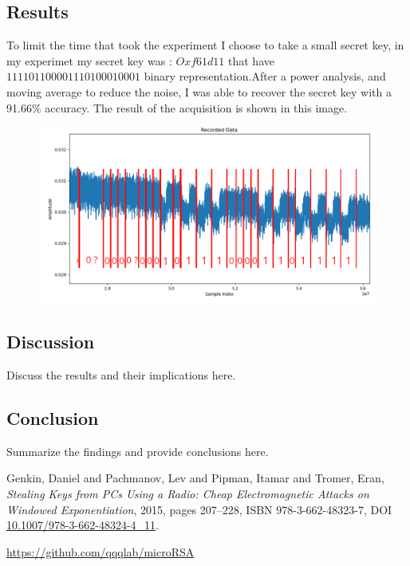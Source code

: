 \documentclass{article}
\begin{document}
\subsection{Results}
To limit the time that took the experiment I choose to take a small secret key, in my experimet my secret key was : $Oxf61d11$ that have $111101100001110100010001$ binary representation.After a power analysis, and moving average to reduce the noise, I was able to recover the secret key with a 91.66\% accuracy. The result of the acquisition is shown in this image.
\begin{figure}[h]
\includegraphics[width=\textwidth]{leaked_secret_key.png}
\end{figure}

\subsection{Discussion}
Discuss the results and their implications here.

\subsection{Conclusion}
Summarize the findings and provide conclusions here.

\begin{thebibliography}{9}

    Genkin, Daniel and Pachmanov, Lev and Pipman, Itamar and Tromer, Eran,
    \emph{Stealing Keys from PCs Using a Radio: Cheap Electromagnetic Attacks on Windowed Exponentiation},
    2015, pages 207--228, ISBN 978-3-662-48323-7, DOI \href{https://doi.org/10.1007/978-3-662-48324-4_11}{10.1007/978-3-662-48324-4\_11}.

    \href{https://github.com/qqqlab/microRSA}{https://github.com/qqqlab/microRSA}

\end{thebibliography}
\end{document}
